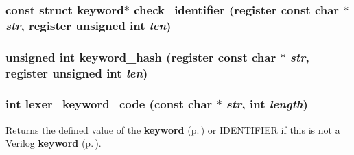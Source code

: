 \subsubsection{\setlength{\rightskip}{0pt plus 5cm}const struct {\bf keyword}$\ast$ check\_\-identifier (register const char $\ast$ {\em str}, register unsigned int {\em len})}\label{keywords_8c_a6}


\subsubsection{\setlength{\rightskip}{0pt plus 5cm}unsigned int keyword\_\-hash (register const char $\ast$ {\em str}, register unsigned int {\em len})\hspace{0.3cm}{\tt  [static]}}\label{keywords_8c_a5}


\subsubsection{\setlength{\rightskip}{0pt plus 5cm}int lexer\_\-keyword\_\-code (const char $\ast$ {\em str}, int {\em length})}\label{keywords_8c_a7}


Returns the defined value of the {\bf keyword} {\rm (p.\,\pageref{structkeyword})} or IDENTIFIER if this is not a Verilog {\bf keyword} {\rm (p.\,\pageref{structkeyword})}.

